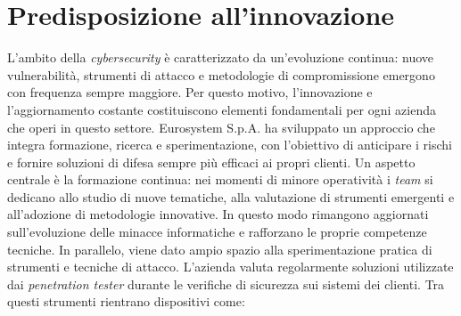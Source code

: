 \section{Predisposizione all'innovazione}

L'ambito della \textit{cybersecurity} è caratterizzato da un'evoluzione continua: nuove vulnerabilità, strumenti di attacco e metodologie di compromissione emergono con frequenza sempre maggiore. Per questo motivo, l'innovazione e l'aggiornamento costante costituiscono elementi fondamentali per ogni azienda che operi in questo settore. Eurosystem S.p.A. ha sviluppato un approccio che integra formazione, ricerca e sperimentazione, con l'obiettivo di anticipare i rischi e fornire soluzioni di difesa sempre più efficaci ai propri clienti.  
Un aspetto centrale è la formazione continua: nei momenti di minore operatività i \textit{team} si dedicano allo studio di nuove tematiche, alla valutazione di strumenti emergenti e all'adozione di metodologie innovative. In questo modo rimangono aggiornati sull'evoluzione delle minacce informatiche e rafforzano le proprie competenze tecniche.  
In parallelo, viene dato ampio spazio alla sperimentazione pratica di strumenti e tecniche di attacco. L'azienda valuta regolarmente soluzioni utilizzate dai \textit{penetration tester} durante le verifiche di sicurezza sui sistemi dei clienti. Tra questi strumenti rientrano dispositivi come:
